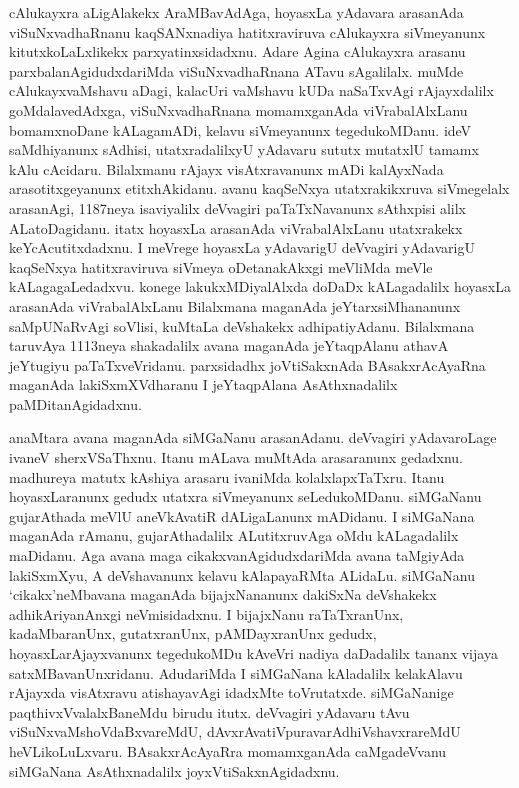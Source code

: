 \documentclass[11pt,a4size]{article}
\begin{document}
cAlukayxra aLigAlakekx AraMBavAdAga, hoyasxLa yAdavara arasanAda
viSuNxvadhaRnanu kaqSANxnadiya hatitxraviruva cAlukayxra siVmeyanunx
kitutxkoLaLxlikekx parxyatinxsidadxnu. Adare Agina cAlukayxra arasanu
parxbalanAgidudxdariMda viSuNxvadhaRnana ATavu sAgalilalx. muMde
cAlukayxvaMshavu aDagi, kalacUri vaMshavu kUDa naSaTxvAgi rAjayxdalilx
goMdalavedAdxga, viSuNxvadhaRnana momamxganAda viVrabalAlxLanu
bomamxnoDane kALagamADi, kelavu siVmeyanunx tegedukoMDanu. ideV
saMdhiyanunx sAdhisi, utatxradalilxyU yAdavaru sututx mutatxlU tamamx
kAlu cAcidaru. Bilalxmanu rAjayx visAtxravanunx mADi kalAyxNada
arasotitxgeyanunx etitxhAkidanu. avanu kaqSeNxya utatxrakikxruva
siVmegelalx arasanAgi, 1187neya isaviyalilx deVvagiri paTaTxNavanunx
sAthxpisi alilx ALatoDagidanu. itatx hoyasxLa arasanAda
viVrabalAlxLanu utatxrakekx keYcAcutitxdadxnu. I meVrege hoyasxLa
yAdavarigU deVvagiri yAdavarigU kaqSeNxya hatitxraviruva siVmeya
oDetanakAkxgi meVliMda meVle kALagagaLedadxvu. konege
lakukxMDiyalAlxda doDaDx kALagadalilx hoyasxLa arasanAda
viVrabalAlxLanu Bilalxmana maganAda jeYtarxsiMhananunx saMpUNaRvAgi
soVlisi, kuMtaLa deVshakekx adhipatiyAdanu. Bilalxmana taruvAya
1113neya shakadalilx avana maganAda jeYtaqpAlanu athavA jeYtugiyu
paTaTxveVridanu. parxsidadhx joVtiSakxnAda BAsakxrAcAyaRna maganAda
lakiSxmXVdharanu I jeYtaqpAlana AsAthxnadalilx paMDitanAgidadxnu.

anaMtara avana maganAda siMGaNanu arasanAdanu. deVvagiri yAdavaroLage
ivaneV sherxVSaThxnu. Itanu mALava muMtAda arasaranunx
gedadxnu. madhureya matutx kAshiya arasaru ivaniMda
kolalxlapxTaTxru. Itanu hoyasxLaranunx gedudx utatxra siVmeyanunx
seLedukoMDanu. siMGaNanu gujarAthada meVlU aneVkAvatiR dALigaLanunx
mADidanu. I siMGaNana maganAda rAmanu, gujarAthadalilx ALutitxruvAga
oMdu kALagadalilx maDidanu. Aga avana maga cikakxvanAgidudxdariMda
avana taMgiyAda lakiSxmXyu, A deVshavanunx kelavu kAlapayaRMta
ALidaLu. siMGaNanu `cikakx'neMbavana maganAda bijajxNananunx dakiSxNa
deVshakekx adhikAriyanAnxgi neVmisidadxnu. I bijajxNanu raTaTxranUnx,
kadaMbaranUnx, gutatxranUnx, pAMDayxranUnx gedudx,
hoyasxLarAjayxvanunx tegedukoMDu kAveVri nadiya daDadalilx tananx
vijaya satxMBavanUnxridanu. AdudariMda I siMGaNana kAladalilx
kelakAlavu rAjayxda visAtxravu atishayavAgi idadxMte
toVrutatxde. siMGaNanige paqthivxVvalalxBaneMdu birudu
itutx. deVvagiri yAdavaru tAvu viSuNxvaMshoVdaBxvareMdU,
dAvxrAvatiVpuravarAdhiVshavxrareMdU heVLikoLuLxvaru. BAsakxrAcAyaRra
momamxganAda caMgadeVvanu siMGaNana AsAthxnadalilx
joyxVtiSakxnAgidadxnu.
\end{document}
